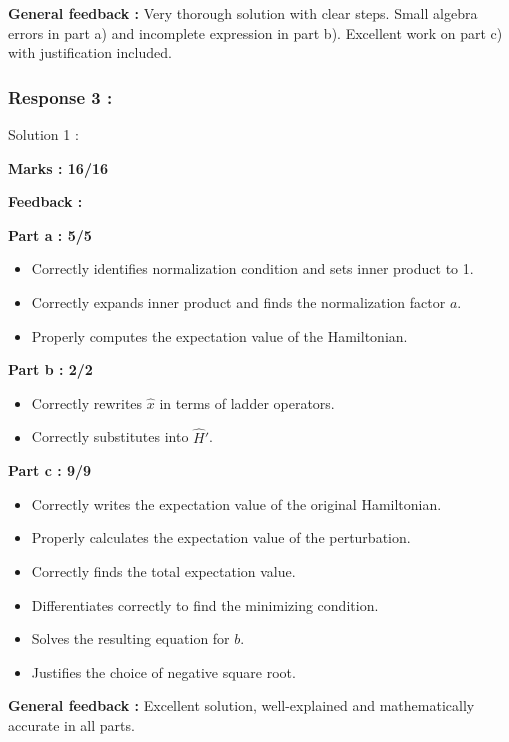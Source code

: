 \documentclass[a4paper,11pt]{article}
\begin{document}
\textbf{General feedback :}
Very thorough solution with clear steps. Small algebra errors in part a) and incomplete expression in part b). Excellent work on part c) with justification included.



\subsubsection*{Response 3 :}

Solution 1 :

\textbf{Marks : 16/16}

\textbf{Feedback :}

\textbf{Part a : 5/5}

\begin{itemize}
    \item Correctly identifies normalization condition and sets inner product to 1.
    \item Correctly expands inner product and finds the normalization factor $a$.
    \item Properly computes the expectation value of the Hamiltonian.
\end{itemize}

\textbf{Part b : 2/2}

\begin{itemize}
    \item Correctly rewrites $\hat{x}$ in terms of ladder operators.
    \item Correctly substitutes into $\hat{H}'$.
\end{itemize}

\textbf{Part c : 9/9}

\begin{itemize}
    \item Correctly writes the expectation value of the original Hamiltonian.
    \item Properly calculates the expectation value of the perturbation.
    \item Correctly finds the total expectation value.
    \item Differentiates correctly to find the minimizing condition.
    \item Solves the resulting equation for $b$.
    \item Justifies the choice of negative square root.
\end{itemize}

\textbf{General feedback :}
Excellent solution, well-explained and mathematically accurate in all parts.
\end{document}
